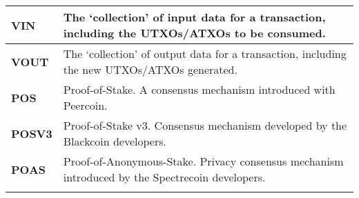 \begin{table}[h]
{\begin{tabular}{@{}ll@{}}
\textbf{VIN} & The ‘collection’ of input data for a transaction, including the UTXOs/ATXOs to be consumed. \\ \midrule
\textbf{VOUT} & The ‘collection’ of output data for a transaction, including the new UTXOs/ATXOs generated. \\ \midrule
\textbf{POS} & Proof-of-Stake. A consensus mechanism introduced with Peercoin. \\ \midrule
\textbf{POSV3} & Proof-of-Stake v3. Consensus mechanism developed by the Blackcoin developers. \\ \midrule
\textbf{POAS} & Proof-of-Anonymous-Stake. Privacy consensus mechanism introduced by the Spectrecoin developers. \\ \midrule
& 
\end{tabular}%
}
\end{table}